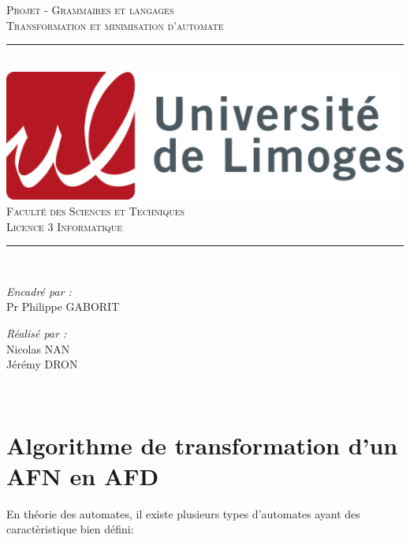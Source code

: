 \documentclass[a4paper]{article}
\begin{document}
\begin{titlepage}
	\centering
    \vspace*{0.5 cm} 
    \textsc{\LARGE Projet - Grammaires et langages}\\[1.0 cm]
    \textsc{\large Transformation et minimisation d'automate}\\[1.0 cm]
	\rule{\linewidth}{0.2 mm} \\[0.4 cm]
	\includegraphics[scale=1]{src/logo.png}\\
	\vspace{0.5cm}
	\textsc{\Large Faculté des Sciences et Techniques}\\[0.2 cm]
	\textsc{\large Licence 3 Informatique }\\
	\rule{\linewidth}{0.2 mm} \\[1.5 cm]
	\begin{minipage}{0.4\textwidth}
	\begin{flushright} \large
		\emph{Encadré par :}\\
		Pr Philippe GABORIT\\
		\end{flushright}
    	\begin{flushright} \large
		\emph{Réalisé par :}\\
		Nicolas NAN\\
		Jérémy DRON \\
		\end{flushright}
	\end{minipage}\\[2 cm]
\end{titlepage}

\section{Algorithme de transformation d'un AFN en AFD}

En théorie des automates, il existe plusieurs types d'automates ayant des 
caractèristique bien défini:\\
\end{document}
